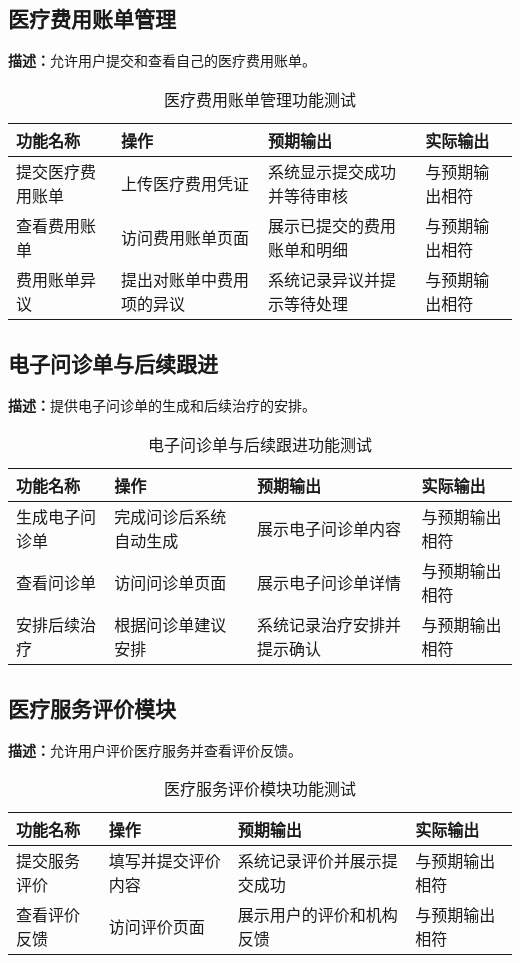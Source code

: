 \subsection{医疗费用账单管理}
\textbf{描述：}允许用户提交和查看自己的医疗费用账单。
\begin{table}[h]
	\centering
	\begin{tabular}{|l|l|l|l|}
		\hline
		\textbf{功能名称} & \textbf{操作} & \textbf{预期输出} & \textbf{实际输出} \\
		\hline
		提交医疗费用账单 & 上传医疗费用凭证 & 系统显示提交成功并等待审核 & 与预期输出相符 \\
		查看费用账单 & 访问费用账单页面 & 展示已提交的费用账单和明细 & 与预期输出相符 \\
		费用账单异议 & 提出对账单中费用项的异议 & 系统记录异议并提示等待处理 & 与预期输出相符 \\
		\hline
	\end{tabular}
	\caption{医疗费用账单管理功能测试}
\end{table}

\subsection{电子问诊单与后续跟进}
\textbf{描述：}提供电子问诊单的生成和后续治疗的安排。
\begin{table}[h]
	\centering
	\begin{tabular}{|l|l|l|l|}
		\hline
		\textbf{功能名称} & \textbf{操作} & \textbf{预期输出} & \textbf{实际输出} \\
		\hline
		生成电子问诊单 & 完成问诊后系统自动生成 & 展示电子问诊单内容 & 与预期输出相符 \\
		查看问诊单 & 访问问诊单页面 & 展示电子问诊单详情 & 与预期输出相符 \\
		安排后续治疗 & 根据问诊单建议安排 & 系统记录治疗安排并提示确认 & 与预期输出相符 \\
		\hline
	\end{tabular}
	\caption{电子问诊单与后续跟进功能测试}
\end{table}

\subsection{医疗服务评价模块}
\textbf{描述：}允许用户评价医疗服务并查看评价反馈。
\begin{table}[h]
	\centering
	\begin{tabular}{|l|l|l|l|}
		\hline
		\textbf{功能名称} & \textbf{操作} & \textbf{预期输出} & \textbf{实际输出} \\
		\hline
		提交服务评价 & 填写并提交评价内容 & 系统记录评价并展示提交成功 & 与预期输出相符 \\
		查看评价反馈 & 访问评价页面 & 展示用户的评价和机构反馈 & 与预期输出相符 \\
		\hline
	\end{tabular}
	\caption{医疗服务评价模块功能测试}
\end{table}

